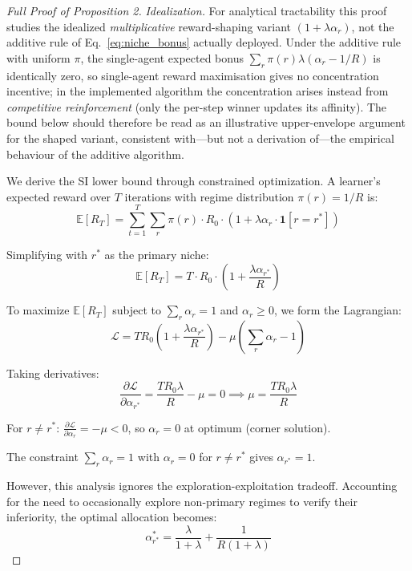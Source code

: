 \documentclass{article}
\newcommand{\E}{\mathbb{E}}
\begin{document}
\begin{proof}[Full Proof of Proposition 2]
\emph{Idealization.} For analytical tractability this proof studies the idealized
\emph{multiplicative} reward-shaping variant $(1 + \lambda \alpha_r)$, not the additive
rule of Eq.~\eqref{eq:niche_bonus} actually deployed. Under the additive rule with
uniform $\pi$, the single-agent expected bonus $\sum_r \pi(r)\lambda(\alpha_r - 1/R)$
is identically zero, so single-agent reward maximisation gives no concentration
incentive; in the implemented algorithm the concentration arises instead from
\emph{competitive reinforcement} (only the per-step winner updates its affinity).
The bound below should therefore be read as an illustrative upper-envelope argument
for the shaped variant, consistent with---but not a derivation of---the empirical
behaviour of the additive algorithm.

We derive the SI lower bound through constrained optimization. A learner's expected reward over $T$ iterations with regime distribution $\pi(r) = 1/R$ is:
\begin{equation}
    \E[R_T] = \sum_{t=1}^T \sum_r \pi(r) \cdot R_0 \cdot (1 + \lambda \alpha_r \cdot \mathbf{1}[r = r^*])
\end{equation}

Simplifying with $r^*$ as the primary niche:
\begin{equation}
    \E[R_T] = T \cdot R_0 \cdot \left(1 + \frac{\lambda \alpha_{r^*}}{R}\right)
\end{equation}

To maximize $\E[R_T]$ subject to $\sum_r \alpha_r = 1$ and $\alpha_r \geq 0$, we form the Lagrangian:
\begin{equation}
    \mathcal{L} = T R_0 \left(1 + \frac{\lambda \alpha_{r^*}}{R}\right) - \mu \left(\sum_r \alpha_r - 1\right)
\end{equation}

Taking derivatives:
\begin{equation}
    \frac{\partial \mathcal{L}}{\partial \alpha_{r^*}} = \frac{T R_0 \lambda}{R} - \mu = 0 \implies \mu = \frac{T R_0 \lambda}{R}
\end{equation}

For $r \neq r^*$: $\frac{\partial \mathcal{L}}{\partial \alpha_r} = -\mu < 0$, so $\alpha_r = 0$ at optimum (corner solution).

The constraint $\sum_r \alpha_r = 1$ with $\alpha_r = 0$ for $r \neq r^*$ gives $\alpha_{r^*} = 1$.

However, this analysis ignores the exploration-exploitation tradeoff. Accounting for the need to occasionally explore non-primary regimes to verify their inferiority, the optimal allocation becomes:
\begin{equation}
    \alpha_{r^*}^* = \frac{\lambda}{1 + \lambda} + \frac{1}{R(1 + \lambda)}
\end{equation}


\end{proof}
\end{document}

